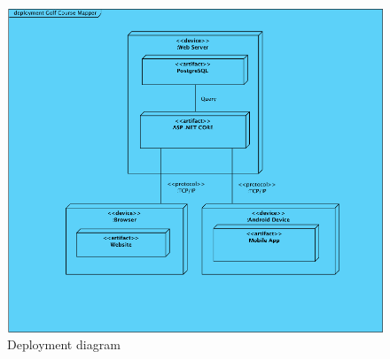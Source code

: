 \documentclass{article}
\begin{document}
    \begin{center}
        \begin{figure}[h]
            \centering
            \includegraphics[scale=0.9]{DeploymentDiagram}
            \caption{Deployment diagram}
            \label{fig:depdia}
        \end{figure}
    \end{center}
\end{document}
